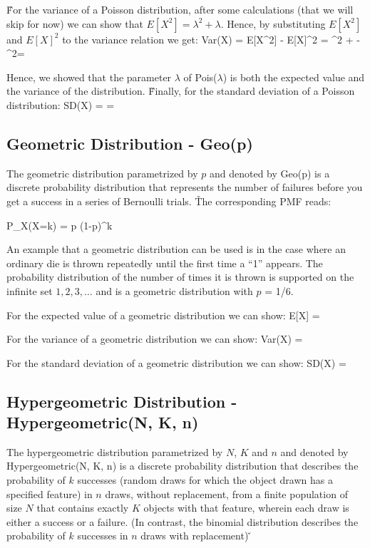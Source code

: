 \v

For the variance of a Poisson distribution, after some calculations (that we will skip for now) we can show that
$E[X^2] = \lambda^2 + \lambda$. Hence, by substituting $E[X^2]$ and $E[X]^2$ to the variance relation we get:
\bse
Var(X) = E[X^{2}] - E[X]^{2} = \lambda^2 + \lambda - \lambda^2= \lambda
\ese

Hence, we showed that the parameter $\lambda$ of Pois($\lambda$) is both the expected value and the variance of the
distribution. \v

Finally, for the standard deviation of a Poisson distribution:
\bse
SD(X) =  = \sqrt{\lambda}
\ese

\subsection{Geometric Distribution - Geo(p)}

The geometric distribution parametrized by $p$ and denoted by Geo(p) is a discrete probability distribution that
represents the number of failures before you get a success in a series of Bernoulli trials. \v

The corresponding PMF reads:

\bse
P_{X}(X=k) = p (1-p)^k
\ese
\ed

\be
An example that a geometric distribution can be used is in the case where an ordinary die is thrown repeatedly until
the first time a ``1'' appears. The probability distribution of the number of times it is thrown is supported on
the infinite set ${1,2,3, \ldots}$ and is a geometric distribution with $p$ = 1/6.
\ee

For the expected value of a geometric distribution we can show:
\bse
E[X] = 
\ese

For the variance of a geometric distribution we can show:
\bse
Var(X) = 
\ese

For the standard deviation of a geometric distribution we can show:
\bse
SD(X) = 
\ese

\subsection{Hypergeometric Distribution - Hypergeometric(N, K, n)}

The hypergeometric distribution parametrized by $N$, $K$ and $n$ and denoted by Hypergeometric(N, K, n) is a discrete
probability distribution that describes the probability of $k$ successes (random draws for which the object drawn has
a specified feature) in $n$ draws, without replacement, from a finite population of size $N$ that contains exactly
$K$ objects with that feature, wherein each draw is either a success or a failure. (In contrast, the binomial
distribution describes the probability of $k$ successes in $n$ draws with replacement) \v

